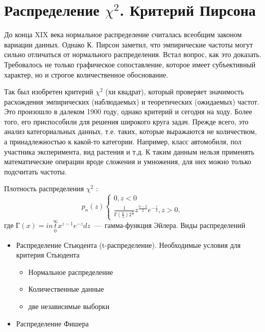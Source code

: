 \documentclass[14pt,a4paper]{article}
\begin{document}
\section{Распределение $\chi^2$. Критерий Пирсона}
До конца XIX века нормальное распределение считалась всеобщим законом вариации данных. Однако К. Пирсон заметил, что эмпирические частоты могут сильно отличаться от нормального распределения. Встал вопрос, как это доказать. Требовалось не только графическое сопоставление, которое имеет субъективный характер, но и строгое количественное обоснование.

Так был изобретен критерий $\chi^2$ (хи квадрат), который проверяет значимость расхождения эмпирических (наблюдаемых) и теоретических (ожидаемых) частот. Это произошло в далеком 1900 году, однако критерий и сегодня на ходу. Более того, его приспособили для решения широкого круга задач. Прежде всего, это анализ категориальных данных, т.е. таких, которые выражаются не количеством, а принадлежностью к какой-то категории. Например, класс автомобиля, пол участника эксперимента, вид растения и т.д. К таким данным нельзя применять математические операции вроде сложения и умножения, для них можно только подсчитать частоты.

Плотность распределения $\chi^2$ \cite{Plis2003}:
\begin{equation}
    p_n(z)\begin{cases}
        0,  z<0\\
        \frac{1}{\text{Г}(\frac{n}{2})2^{\frac{n}{2}}}z^\frac{n-2}{2}e^{-\frac{z}{2}}, z>0,
    \end{cases}
\end{equation}
где $\text{Г}(x) = int\limits_{0}^{\infty} x^{z-1}e^{-z}dz$~---~гамма-функция Эйлера.
Виды распределений
\begin{itemize}
    \item Распределение Стьюдента (t-распределение).
    Необходимые условия для критерия Стьюдента
    \begin{itemize}
        \item Нормальное распределение
        \item Количественные данные
        \item две независимые выборки
    \end{itemize}
    \item  Распределение Фишера
\end{itemize}
\printbibliography[title={Рекомендуемая литература}]
\end{document}
